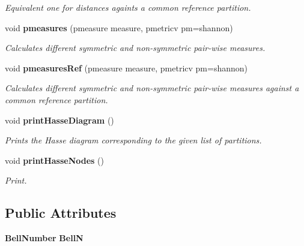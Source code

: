 \begin{CompactItemize}
\begin{CompactList}\small\item\em Equivalent one for distances againts a common reference partition. \item\end{CompactList}\item 
void {\bf pmeasures} (pmeasure measure, pmetricv pm=shannon)\label{classPartitionStats_a44}

\begin{CompactList}\small\item\em Calculates different symmetric and non-symmetric pair-wise measures. \item\end{CompactList}\item 
void {\bf pmeasures\-Ref} (pmeasure measure, pmetricv pm=shannon)\label{classPartitionStats_a45}

\begin{CompactList}\small\item\em Calculates different symmetric and non-symmetric pair-wise measures against a common reference partition. \item\end{CompactList}\item 
void {\bf print\-Hasse\-Diagram} ()\label{classPartitionStats_a46}

\begin{CompactList}\small\item\em Prints the Hasse diagram corresponding to the given list of partitions. \item\end{CompactList}\item 
void {\bf print\-Hasse\-Nodes} ()\label{classPartitionStats_a47}

\begin{CompactList}\small\item\em Print. \item\end{CompactList}\end{CompactItemize}
\subsection*{Public Attributes}
\begin{CompactItemize}
\item 
{\bf Bell\-Number} {\bf Bell\-N}\label{classPartitionStats_o0}

\end{CompactItemize}


